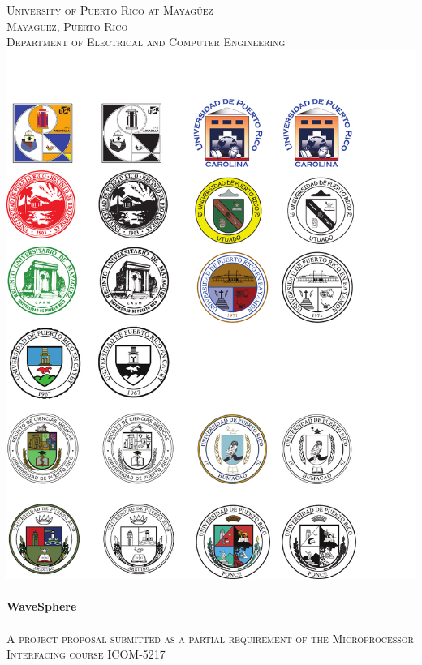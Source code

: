 \begin{titlepage}

\begin{center}


    

\textsc{\large University of Puerto Rico at Mayag\"{u}ez}\\[0.5cm]
\textsc{\large Mayag\"{u}ez, Puerto Rico}\\[0.5cm]
\textsc{\normalsize Department of Electrical and Computer Engineering}\\[1.5cm]
\includegraphics[scale=1.25]{res/logo_rum}\\[1cm]


\HRule \\[0.5cm]
{ \huge \bfseries WaveSphere}\\[0.2cm]
\HRule \\[0.5cm]
\textsc{A project proposal submitted as a partial requirement of the Microprocessor Interfacing course ICOM-5217}\\[0.5cm]


\end{center}
\end{titlepage}

